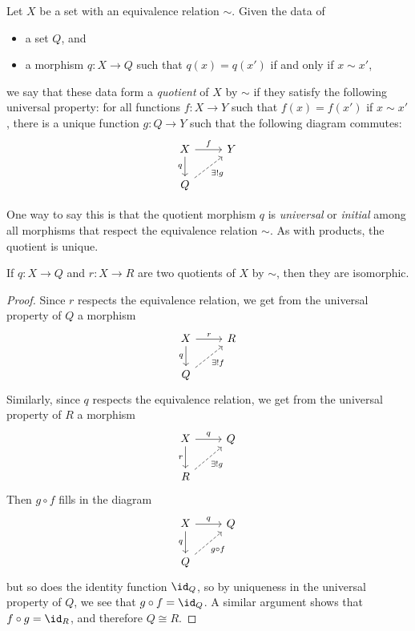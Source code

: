 \documentclass[noname]{notes}
\begin{document}
\begin{definition}
	Let $X$ be a set with an equivalence relation\footnotemark{} $\sim$. Given the data of 
	\begin{itemize}
		\item a set $Q$, and 
		\item a morphism $q \colon X \to Q$ such that $q(x) = q(x')$ if and only if $x \sim x'$,
	\end{itemize}
	we say that these data form a \emph{quotient} of $X$ by $\sim$ if they satisfy the following universal property: for all functions $f \colon X \to Y$ such that $f(x) = f(x')$ if $x \sim x'$, there is a unique function $g \colon Q \to Y$ such that the following diagram commutes: 
	\[
		\begin{tikzcd}
			X \ar[r, "f"] \ar[d, "q"'] & Y \\
			Q \ar[ur, dashed, "\exists! g"'] 
		\end{tikzcd}
	\]
\end{definition}	

One way to say this is that the quotient morphism $q$ is \emph{universal} or \emph{initial} among all morphisms that respect the equivalence relation $\sim$. As with products, the quotient is unique. 

\begin{proposition}
	If $q \colon X \to Q$ and $r \colon X \to R$ are two quotients of $X$ by $\sim$, then they are isomorphic. 
\end{proposition}

\begin{proof}
	Since $r$ respects the equivalence relation, we get from the universal property of $Q$ a morphism 
	\[
		\begin{tikzcd}
			X \ar[r, "r"] \ar[d, "q"'] & R \\
			Q \ar[ur, dashed, "\exists! f"'] 
		\end{tikzcd}
	\]
	Similarly, since $q$ respects the equivalence relation, we get from the universal property of $R$ a morphism 
	\[
		\begin{tikzcd}
			X \ar[r, "q"] \ar[d, "r"'] & Q \\
			R \ar[ur, dashed, "\exists! g"'] 
		\end{tikzcd}
	\]
	Then $g \circ f$ fills in the diagram 
	\[
		\begin{tikzcd}
			X \ar[r, "q"] \ar[d, "q"'] & Q \\
			Q \ar[ur, dashed, "g \circ f"'] 
		\end{tikzcd}
	\]
	but so does the identity function $\id_Q$, so by uniqueness in the universal property of $Q$, we see that $g \circ f = \id_Q$. A similar argument shows that $f \circ g = \id_R$, and therefore $Q \cong R$. 
\end{proof}
\end{document}
